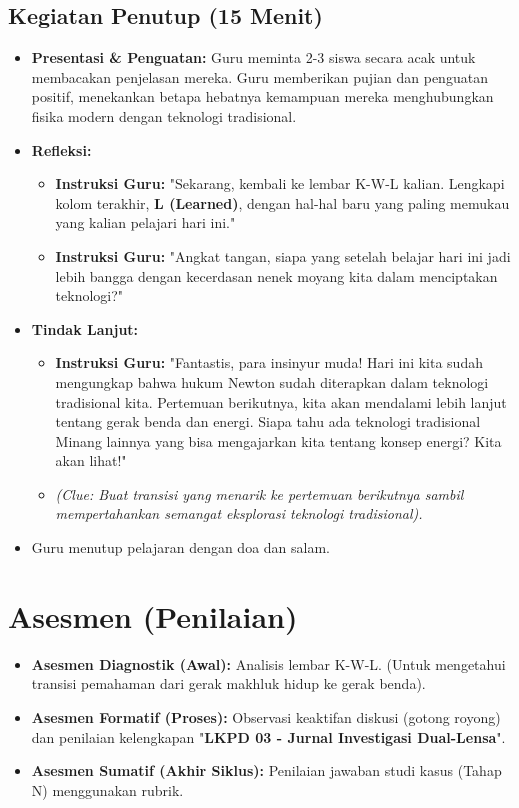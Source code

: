 \documentclass[a4paper,12pt]{article}
\begin{document}
\subsection{Kegiatan Penutup (15 Menit)}
\begin{itemize}
\item \textbf{Presentasi \& Penguatan:} Guru meminta 2-3 siswa secara acak untuk membacakan penjelasan mereka. Guru memberikan pujian dan penguatan positif, menekankan betapa hebatnya kemampuan mereka menghubungkan fisika modern dengan teknologi tradisional.
\item \textbf{Refleksi:}
    \begin{itemize}
    \item \textbf{Instruksi Guru:} "Sekarang, kembali ke lembar K-W-L kalian. Lengkapi kolom terakhir, \textbf{L (Learned)}, dengan hal-hal baru yang paling memukau yang kalian pelajari hari ini."
    \item \textbf{Instruksi Guru:} "Angkat tangan, siapa yang setelah belajar hari ini jadi lebih bangga dengan kecerdasan nenek moyang kita dalam menciptakan teknologi?"
    \end{itemize}
\item \textbf{Tindak Lanjut:}
    \begin{itemize}
    \item \textbf{Instruksi Guru:} "Fantastis, para insinyur muda! Hari ini kita sudah mengungkap bahwa hukum Newton sudah diterapkan dalam teknologi tradisional kita. Pertemuan berikutnya, kita akan mendalami lebih lanjut tentang gerak benda dan energi. Siapa tahu ada teknologi tradisional Minang lainnya yang bisa mengajarkan kita tentang konsep energi? Kita akan lihat!"
    \item \textit{(Clue: Buat transisi yang menarik ke pertemuan berikutnya sambil mempertahankan semangat eksplorasi teknologi tradisional).}
    \end{itemize}
\item Guru menutup pelajaran dengan doa dan salam.
\end{itemize}

\section{Asesmen (Penilaian)}

\begin{itemize}
\item \textbf{Asesmen Diagnostik (Awal):} Analisis lembar K-W-L. (Untuk mengetahui transisi pemahaman dari gerak makhluk hidup ke gerak benda).
\item \textbf{Asesmen Formatif (Proses):} Observasi keaktifan diskusi (gotong royong) dan penilaian kelengkapan "\textbf{LKPD 03 - Jurnal Investigasi Dual-Lensa}".
\item \textbf{Asesmen Sumatif (Akhir Siklus):} Penilaian jawaban studi kasus (Tahap N) menggunakan rubrik.
\end{itemize}
\end{document}
